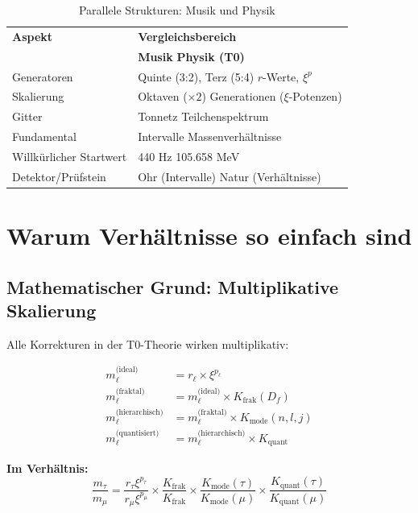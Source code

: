 \begin{table}[h]
	\centering
	\begin{tabular}{@{}p{}p{}@{}}
		\toprule
		\textbf{Aspekt} & \textbf{Vergleichsbereich} \\
		& \textbf{Musik} \hspace{0.5cm} \textbf{Physik (T0)} \\
		\midrule
		Generatoren & Quinte (3:2), Terz (5:4) \hfill $r$-Werte, $\xi^p$ \\
		Skalierung & Oktaven ($\times 2$) \hfill Generationen ($\xi$-Potenzen) \\
		Gitter & Tonnetz \hfill Teilchenspektrum \\
		Fundamental & Intervalle \hfill Massenverhältnisse \\
		Willkürlicher Startwert & 440 Hz \hfill 105.658 MeV \\
		Detektor/Prüfstein & Ohr (Intervalle) \hfill Natur (Verhältnisse) \\
		\bottomrule
	\end{tabular}
	\caption{Parallele Strukturen: Musik und Physik}
	\label{tab:musik_physik}
\end{table}

\section{Warum Verhältnisse so einfach sind}

\subsection{Mathematischer Grund: Multiplikative Skalierung}

Alle Korrekturen in der T0-Theorie wirken multiplikativ:

\begin{align}
	m_\ell^\text{(ideal)} &= r_\ell \times \xi^{p_\ell} \\
	m_\ell^\text{(fraktal)} &= m_\ell^\text{(ideal)} \times K_\text{frak}(D_f) \\
	m_\ell^\text{(hierarchisch)} &= m_\ell^\text{(fraktal)} \times K_\text{mode}(n,l,j) \\
	m_\ell^\text{(quantisiert)} &= m_\ell^\text{(hierarchisch)} \times K_\text{quant}
\end{align}

\textbf{Im Verhältnis:}
\begin{equation}
	\frac{m_\tau}{m_\mu} = \frac{r_\tau \xi^{p_\tau}}{r_\mu \xi^{p_\mu}} \times \frac{K_\text{frak}}{K_\text{frak}} \times \frac{K_\text{mode}(\tau)}{K_\text{mode}(\mu)} \times \frac{K_\text{quant}(\tau)}{K_\text{quant}(\mu)}
\end{equation}

